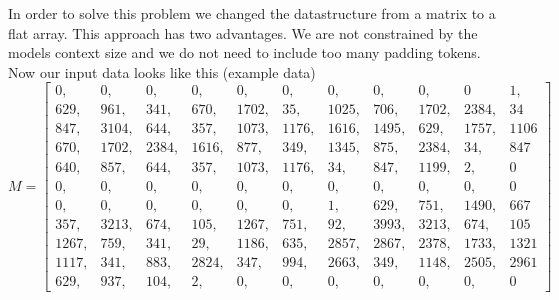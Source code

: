 \documentclass[a4paper,12pt]{extarticle}
\begin{document}
In order to solve this problem we changed the datastructure from a matrix to a flat array. This approach has two advantages. We are not constrained by the models context size and we do not need to include too many padding tokens. Now our input data looks like this (example data)
\[
M =
\left[
\begin{array}{lllllllllll} 
0,      & 0,      & 0,      & 0,      & 0,      & 0,      & 0,      & 0,      & 0,      & 0       & 1,           \\
629,    & 961,    & 341,    & 670,    & 1702,   & 35,     & 1025,   & 706,    & 1702,   & 2384,   & 34     \\
847,    & 3104,   & 644,    & 357,    & 1073,   & 1176,   & 1616,   & 1495,   & 629,    & 1757,   & 1106   \\
670,    & 1702,   & 2384,   & 1616,   & 877,    & 349,    & 1345,   & 875,    & 2384,   & 34,     & 847    \\
640,    & 857,    & 644,    & 357,    & 1073,   & 1176,   & 34,     & 847,    & 1199,   & 2,      & 0      \\
0,      & 0,      & 0,      & 0,      & 0,      & 0,      & 0,      & 0,      & 0,      & 0,      & 0      \\
0,      & 0,      & 0,      & 0,      & 0,      & 0,      & 1,      & 629,    & 751,    & 1490,   & 667    \\
357,    & 3213,   & 674,    & 105,    & 1267,   & 751,    & 92,     & 3993,   & 3213,   & 674,    & 105    \\
1267,   & 759,    & 341,    & 29,     & 1186,   & 635,    & 2857,   & 2867,   & 2378,   & 1733,   & 1321   \\
1117,   & 341,    & 883,    & 2824,   & 347,    & 994,    & 2663,   & 349,    & 1148,   & 2505,   & 2961   \\
629,    & 937,    & 104,    & 2,      & 0,      & 0,      & 0,      & 0,      & 0,      & 0,      & 0
\end{array}
\right]
\]
\end{document}
